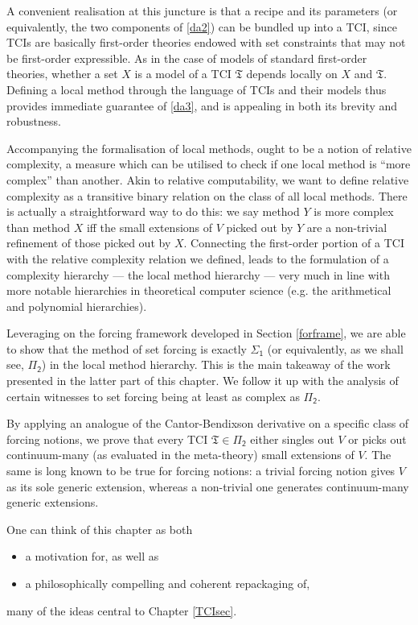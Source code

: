 \documentclass[12pt, twoside]{memoir}
\numberwithin{equation}{section}
\theoremstyle{definition}
\theoremstyle{remark}
\theoremstyle{definition}
\theoremstyle{definition}
\theoremstyle{definition}
\theoremstyle{remark}
\begin{document}
A convenient realisation at this juncture is that a recipe and its parameters (or equivalently, the two components of \ref{da2}) can be bundled up into a TCI, since TCIs are basically first-order theories endowed with set constraints that may not be first-order expressible. As in the case of models of standard first-order theories, whether a set $X$ is a model of a TCI $\mathfrak{T}$ depends locally on $X$ and $\mathfrak{T}$. Defining a local method through the language of TCIs and their models thus provides immediate guarantee of \ref{da3}, and is appealing in both its brevity and robustness.

Accompanying the formalisation of local methods, ought to be a notion of relative complexity, a measure which can be utilised to check if one local method is ``more complex'' than another. Akin to relative computability, we want to define relative complexity as a transitive binary relation on the class of all local methods. There is actually a straightforward way to do this: we say method $Y$ is more complex than method $X$ iff the small extensions of $V$ picked out by $Y$ are a non-trivial refinement of those picked out by $X$. Connecting the first-order portion of a TCI with the relative complexity relation we defined, leads to the formulation of a complexity hierarchy --- the local method hierarchy --- very much in line with more notable hierarchies in theoretical computer science (e.g. the arithmetical and polynomial hierarchies).

Leveraging on the forcing framework developed in Section \ref{forframe}, we are able to show that the method of set forcing is exactly $\mathsf{\Sigma_1}$ (or equivalently, as we shall see, $\mathsf{\Pi_2}$) in the local method hierarchy. This is the main takeaway of the work presented in the latter part of this chapter. We follow it up with the analysis of certain witnesses to set forcing being at least as complex as $\mathsf{\Pi_2}$.

By applying an analogue of the Cantor-Bendixson derivative on a specific class of forcing notions, we prove that every TCI $\mathfrak{T} \in \mathsf{\Pi_2}$ either singles out $V$ or picks out continuum-many (as evaluated in the meta-theory) small extensions of $V$. The same is long known to be true for forcing notions: a trivial forcing notion gives $V$ as its sole generic extension, whereas a non-trivial one generates continuum-many generic extensions.

One can think of this chapter as both 
\begin{itemize}
    \item a motivation for, as well as 
    \item a philosophically compelling and coherent repackaging of, 
\end{itemize}
many of the ideas central to Chapter \ref{TCIsec}. 
\end{document}
